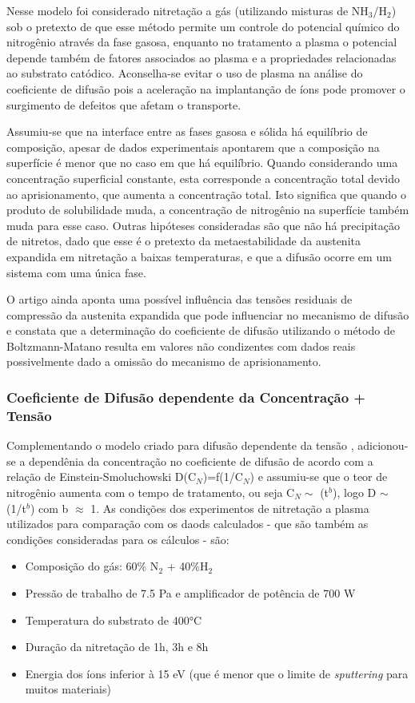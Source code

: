 \documentclass[]{politex}
\begin{document}
	Nesse modelo foi considerado nitretação a gás (utilizando misturas de NH$_3$/H$_2$) sob o pretexto de que esse método permite um controle do potencial químico do nitrogênio através da fase gasosa, enquanto no tratamento a plasma o potencial depende também de fatores associados ao plasma e a propriedades relacionadas ao substrato catódico. Aconselha-se evitar o uso de plasma na análise do coeficiente de difusão pois a aceleração na implantanção de íons pode promover o surgimento de defeitos que afetam o transporte.\par
	Assumiu-se que na interface entre as fases gasosa e sólida há equilíbrio de composição, apesar de dados experimentais apontarem que a composição na superfície é menor que no caso em que há equilíbrio. Quando considerando uma concentração superficial constante, esta corresponde a concentração total devido ao aprisionamento, que aumenta a concentração total. Isto significa que quando o produto de solubilidade muda, a concentração de nitrogênio na superfície também muda para esse caso. Outras hipóteses consideradas são que não há precipitação de nitretos, dado que esse é o pretexto da metaestabilidade da austenita expandida em nitretação a baixas temperaturas, e que a difusão ocorre em um sistema com uma única fase.\par
	O artigo ainda aponta uma possível influência das tensões residuais de compressão da austenita expandida que pode influenciar no mecanismo de difusão e constata que a determinação do coeficiente de difusão utilizando o método de Boltzmann-Matano resulta em valores não condizentes com dados reais possivelmente dado a omissão do mecanismo de aprisionamento.
	
\subsubsection{Coeficiente de Difusão dependente da Concentração + Tensão}
\label{sec:comb-depc-stress}
	Complementando o modelo criado para difusão dependente da tensão \cite{galdikas2010stress}, adicionou-se a dependênia da concentração no coeficiente de difusão de acordo com a relação de Einstein-Smoluchowski D(C$_N$)=f(1/C$_N$) \cite{moskalioviene2012stress} e assumiu-se que o teor de nitrogênio aumenta com o tempo de tratamento, ou seja C$_N\sim$ (t$^b$), logo D $\sim$ (1/t$^b$) com b $\approx$ 1.
	As condições dos experimentos de nitretação a plasma utilizados para comparação com os daods calculados - que são também as condições consideradas para os cálculos - são: 
	\begin{itemize}
	 \item Composição do gás: 60\% N$_2$ + 40\%H$_2$
	 \item Pressão de trabalho de 7.5 Pa e amplificador de potência de 700 W
	 \item Temperatura do substrato de 400°C
	 \item Duração da nitretação de 1h, 3h e 8h
  	 \item Energia dos íons inferior à 15 eV (que é menor que o limite de \textit{sputtering} para muitos materiais)
	\end{itemize}
	
\end{document}
